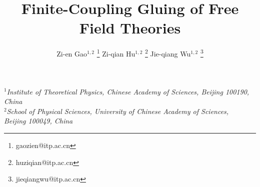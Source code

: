 \title{\textbf{Finite-Coupling Gluing of Free Field Theories}}
\author{
Zi-en Gao${}^{1,2}$ \footnote{gaozien@itp.ac.cn}
Zi-qian Hu${}^{1,2}$ \footnote{huziqian@itp.ac.cn}
Jie-qiang Wu${}^{1,2}$ \footnote{jieqiangwu@itp.ac.cn}
}
\date{}
\maketitle

\begin{center}
{\it
$^{1}$Institute of Theoretical Physics, Chinese Academy of Sciences, Beijing 100190, China \\
$^{2}$School of Physical Sciences, University of Chinese Academy of Sciences, \\ Beijing 100049, China
}
\end{center}
